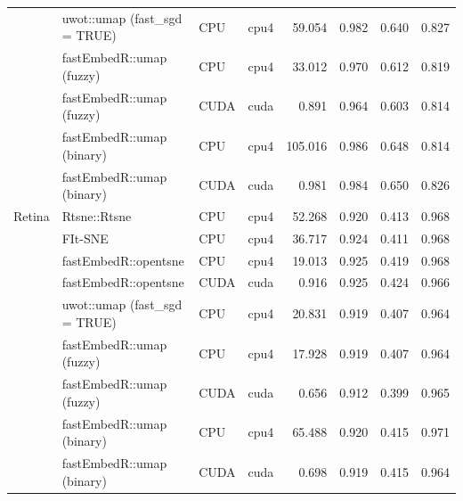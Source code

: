 {\begin{longtable}{p{}p{}llrrrr}
 & uwot::umap (fast\_sgd = TRUE) & CPU & cpu4 & 59.054 & 0.982 & 0.640 & 0.827\\
 & fastEmbedR::umap (fuzzy) & CPU & cpu4 & 33.012 & 0.970 & 0.612 & 0.819\\
 & fastEmbedR::umap (fuzzy) & CUDA & cuda & 0.891 & 0.964 & 0.603 & 0.814\\
 & fastEmbedR::umap (binary) & CPU & cpu4 & 105.016 & 0.986 & 0.648 & 0.814\\
 & fastEmbedR::umap (binary) & CUDA & cuda & 0.981 & 0.984 & 0.650 & 0.826\\
\addlinespace[2pt]
Retina & Rtsne::Rtsne & CPU & cpu4 & 52.268 & 0.920 & 0.413 & 0.968\\
 & FIt-SNE & CPU & cpu4 & 36.717 & 0.924 & 0.411 & 0.968\\
 & fastEmbedR::opentsne & CPU & cpu4 & 19.013 & 0.925 & 0.419 & 0.968\\
 & fastEmbedR::opentsne & CUDA & cuda & 0.916 & 0.925 & 0.424 & 0.966\\
 & uwot::umap (fast\_sgd = TRUE) & CPU & cpu4 & 20.831 & 0.919 & 0.407 & 0.964\\
 & fastEmbedR::umap (fuzzy) & CPU & cpu4 & 17.928 & 0.919 & 0.407 & 0.964\\
 & fastEmbedR::umap (fuzzy) & CUDA & cuda & 0.656 & 0.912 & 0.399 & 0.965\\
 & fastEmbedR::umap (binary) & CPU & cpu4 & 65.488 & 0.920 & 0.415 & 0.971\\
 & fastEmbedR::umap (binary) & CUDA & cuda & 0.698 & 0.919 & 0.415 & 0.964\\
\bottomrule
\end{longtable}
}
